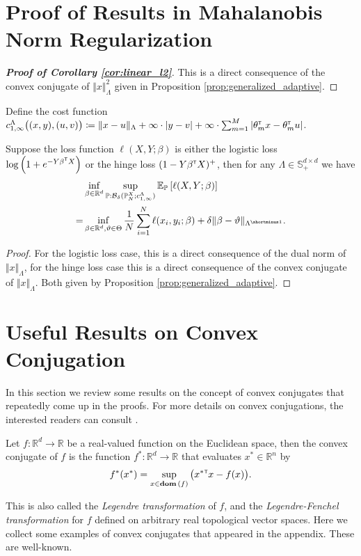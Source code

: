 \documentclass[12pt]{article}
\begin{document}
\section{Proof of Results in Mahalanobis Norm Regularization}
\begin{proof}[\textbf{Proof of Corollary \ref{cor:linear_l2}}]
    This is a direct consequence of the convex conjugate of $\Vert x\Vert_{\Lambda}^2$ given in Proposition \ref{prop:generalized_adaptive}.
\end{proof}

Define the cost function $c_{1,\infty}^\Lambda\big((x,y),(u,v)\big) \coloneqq \Vert x-u\Vert_{\Lambda} + \infty\cdot|y-v| + \infty\cdot\sum_{m=1}^M|\theta_m^{\scriptscriptstyle \sf T} x - \theta_m^{\scriptscriptstyle \sf T} u|$. 

\begin{corollary}
\label{cor:logistic}
    Suppose the loss function $\ell(X,Y;\beta)$ is either the logistic loss $\log{\left(1+e^{-Y\beta^{\scriptscriptstyle \sf T}X}\right)}$ or the hinge loss $(1-Y\beta^{\scriptscriptstyle \sf T} X)^+$, then for any $\Lambda\in\mathbb{S}_+^{d\times d}$  we have
\begin{align*}
    &\inf_{\beta\in\mathbb{R}^d} \sup_{\mathbb{P}:\mathcal{B}_\delta(\mathbb{P}_N^X;c^\Lambda_{1,\infty})} \mathbb{E}_{\mathbb{P}}\left[\ell(X,Y;\beta)\right]\\
   =& \inf_{\beta\in\mathbb{R}^d,\vartheta\in\Theta}\dfrac{1}{N}\sum_{i=1}^N \ell(x_i,y_i;\beta) + \delta \Vert \beta - \vartheta \Vert_{\Lambda^{\shortminus 1}}.
\end{align*}
\end{corollary}
\begin{proof}
    For the logistic loss case, this is a direct consequence of the dual norm of $\Vert x\Vert_{\Lambda}$, for the hinge loss case this is a direct consequence of the convex conjugate of $\Vert x\Vert_{\Lambda}$. Both given by Proposition \ref{prop:generalized_adaptive}.
\end{proof}

\section{Useful Results on Convex Conjugation}
In this section we review some results on the concept of convex conjugates that repeatedly come up in the proofs. For more details on convex conjugations, the interested readers can consult \citep[Sections 12 \& 16]{rockafellar1970convex}.

\begin{definition}
    Let $f:\mathbb{R}^d\to\mathbb{R}$ be a real-valued function on the Euclidean space, then the convex conjugate of $f$ is the function $f^*:\mathbb{R}^d\to \mathbb{R}$ that evaluates $x^*\in\mathbb{R}^n$ by \[
    f^*(x^*) = \sup_{x\in\operatorname{\textbf{dom}}{(f)}}\big( x^*{^{\scriptscriptstyle \sf T}}x -f(x)\big).
    \]
\end{definition}
This is also called the \textit{Legendre transformation} of $f$, and the \textit{Legendre-Fenchel transformation} for $f$ defined on arbitrary real topological vector spaces. Here we collect some examples of convex conjugates that appeared in the appendix. These are well-known.
\end{document}

